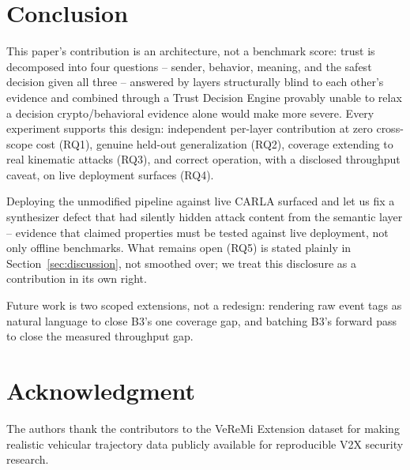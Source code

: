 \documentclass[conference]{IEEEtran}
\begin{document}
\section{Conclusion}
\label{sec:conclusion}
This paper's contribution is an architecture, not a benchmark score: trust is decomposed into four questions -- sender, behavior, meaning, and the safest decision given all three -- answered by layers structurally blind to each other's evidence and combined through a Trust Decision Engine provably unable to relax a decision crypto/behavioral evidence alone would make more severe. Every experiment supports this design: independent per-layer contribution at zero cross-scope cost (RQ1), genuine held-out generalization (RQ2), coverage extending to real kinematic attacks (RQ3), and correct operation, with a disclosed throughput caveat, on live deployment surfaces (RQ4).

Deploying the unmodified pipeline against live CARLA surfaced and let us fix a synthesizer defect that had silently hidden attack content from the semantic layer -- evidence that claimed properties must be tested against live deployment, not only offline benchmarks. What remains open (RQ5) is stated plainly in Section~\ref{sec:discussion}, not smoothed over; we treat this disclosure as a contribution in its own right.

Future work is two scoped extensions, not a redesign: rendering raw event tags as natural language to close B3's one coverage gap, and batching B3's forward pass to close the measured throughput gap.

\section*{Acknowledgment}
The authors thank the contributors to the VeReMi Extension dataset for making realistic vehicular trajectory data publicly available for reproducible V2X security research.

\appendices
\end{document}
